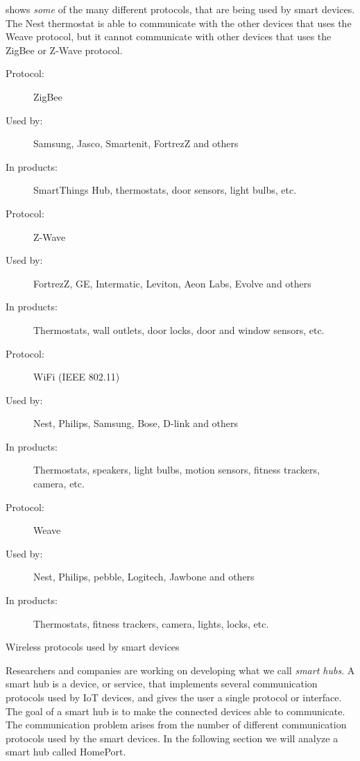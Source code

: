  shows \emph{some} of the many different protocols, 
that are being used by smart devices. 
The Nest thermostat is able to communicate with the other devices that uses the Weave protocol, 
but it cannot communicate with other devices that uses \eg the ZigBee or Z-Wave protocol. 

\begin{table}[!htb]
  \begin{description}
    \item[Protocol:] ZigBee
    \item[Used by:] Samsung, Jasco, Smartenit, FortrezZ and others
    \item[In products:] SmartThings Hub, thermostats, door sensors, light bulbs, etc.\\
    
    \item[Protocol:] Z-Wave
    \item[Used by:] FortrezZ, GE, Intermatic, Leviton, Aeon Labs, Evolve and others
    \item[In products:] Thermostats, wall outlets, door locks, door and window sensors, etc.  \\
    
    \item[Protocol:] WiFi (IEEE 802.11)
    \item[Used by:] Nest, Philips, Samsung, Bose, D-link and others
    \item[In products:] Thermostats, speakers, light bulbs, motion sensors, fitness trackers, camera, etc. \\
    
    \item[Protocol:] Weave
    \item[Used by:] Nest, Philips, pebble, Logitech, Jawbone and others
    \item[In products:] Thermostats, fitness trackers, camera, lights, locks, etc. 
  \end{description}
  \caption{Wireless protocols used by smart devices}\label{table:iotprotocols}
\end{table}

Researchers and companies are working on developing what we call \emph{smart hubs}. 
A smart hub is a device, or service, 
that implements several communication protocols used by IoT devices, 
and gives the user a single protocol or interface. 
The goal of a smart hub is to make the connected devices able to communicate.
The communication problem arises from the number of different communication protocols used by the smart devices. 
In the following section we will analyze a smart hub called HomePort. 

